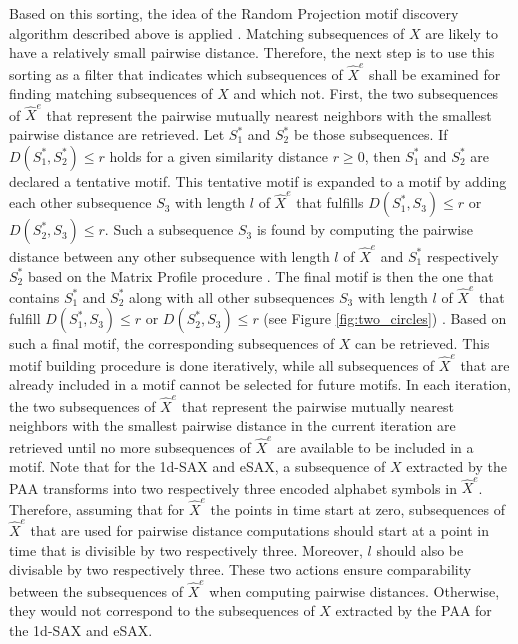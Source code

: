 Based on this sorting, the idea of the Random Projection motif discovery algorithm described above is applied \cite{Random_Projection}. Matching subsequences of $X$ are likely to have a relatively small pairwise distance. Therefore, the next step is to use this sorting as a filter that indicates which subsequences of $\hat{X}^e$ shall be examined for finding matching subsequences of $X$ and which not. First, the two subsequences of $\hat{X}^e$ that represent the pairwise mutually nearest neighbors with the smallest pairwise distance are retrieved. Let $S_{1}^*$ and $S_{2}^*$ be those subsequences. If $D(S_{1}^*,S_{2}^*) \leq r$ holds for a given similarity distance $r \geq 0$, then $S_{1}^*$ and $S_{2}^*$ are declared a tentative motif. This tentative motif is expanded to a motif by adding each other subsequence $S_3$ with length $l$ of $\hat{X}^e$ that fulfills $D(S_{1}^*,S_{3}) \leq r$ or $D(S_{2}^*,S_{3}) \leq r$. Such a subsequence $S_3$ is found by computing the pairwise distance between any other subsequence with length $l$ of $\hat{X}^e$ and $S_{1}^*$ respectively $S_{2}^*$ based on the Matrix Profile procedure \cite{Matrix_Profile}. \newline
The final motif is then the one that contains $S_{1}^*$ and $S_{2}^*$ along with all other subsequences $S_3$ with length $l$ of $\hat{X}^e$ that fulfill $D(S_{1}^*,S_{3}) \leq r$ or $D(S_{2}^*,S_{3}) \leq r$ (see Figure \ref{fig:two_circles}) \cite{Random_Projection}. Based on such a final motif, the corresponding subsequences of $X$ can be retrieved. This motif building procedure is done iteratively, while all subsequences of $\hat{X}^e$ that are already included in a motif cannot be selected for future motifs. In each iteration, the two subsequences of $\hat{X}^e$ that represent the pairwise mutually nearest neighbors with the smallest pairwise distance in the current iteration are retrieved until no more subsequences of $\hat{X}^e$ are available to be included in a motif. \newline
Note that for the \ac{1d-SAX} and \ac{eSAX}, a subsequence of $X$ extracted by the \ac{PAA} transforms into two respectively three encoded alphabet symbols in $\hat{X}^e$. Therefore, assuming that for $\hat{X}^e$ the points in time start at zero, subsequences of $\hat{X}^e$ that are used for pairwise distance computations should start at a point in time that is divisible by two respectively three. Moreover, $l$ should also be divisable by two respectively three. These two actions ensure comparability between the subsequences of $\hat{X}^e$ when computing pairwise distances. Otherwise, they would not correspond to the subsequences of $X$ extracted by the \ac{PAA} for the \ac{1d-SAX} and \ac{eSAX}.
